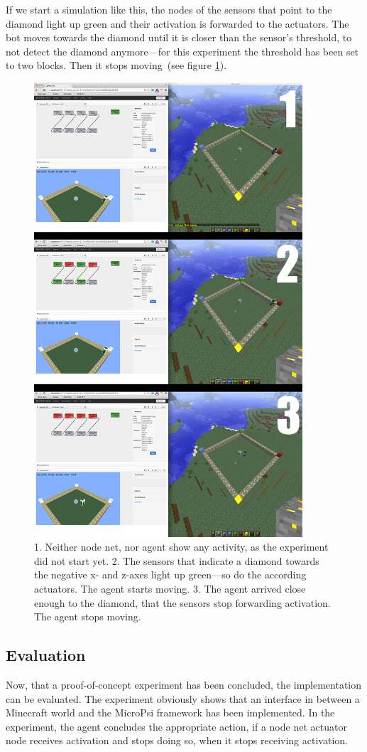 If we start a simulation like this, the nodes of the sensors that point to the diamond light up green and their activation is forwarded to the actuators. The bot moves towards the diamond until it is closer than the sensor's threshold, to not detect the diamond anymore---for this experiment the threshold has been set to two blocks. Then it stops moving~(see figure \ref{diamond_screens}).

\begin{figure}[h]
  \centering
    \includegraphics[width=10cm]{graphics/diamond_screens}
  \caption{1. Neither node net, nor agent show any activity, as the experiment did not start yet.  2. The sensors that indicate a diamond towards the negative x- and z-axes light up green---so do the according actuators. The agent starts moving.  3. The agent arrived close enough to the diamond, that the sensors stop forwarding activation. The agent stops moving.}
  \label{diamond_screens}
\end{figure}

        \subsection{Evaluation}
Now, that a proof-of-concept experiment has been concluded, the implementation can be evaluated.
The experiment obviously shows that an interface in between a Minecraft world and the MicroPsi framework has been implemented. In the experiment, the agent concludes the appropriate action, if a node net actuator node receives activation and stops doing so, when it stops receiving activation.

